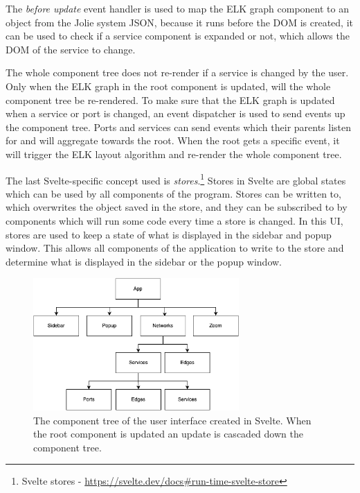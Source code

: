 The \textit{before update} event handler is used to map the ELK graph component to an object from the Jolie system JSON, because it runs before the DOM is created, it can be used to check if a service component is expanded or not, which allows the DOM of the service to change.

The whole component tree does not re-render if a service is changed by the user. Only when the ELK graph in the root component is updated, will the whole component tree be re-rendered. To make sure that the ELK graph is updated when a service or port is changed, an event dispatcher is used to 
send events up the component tree. Ports and services can send events which their parents listen for and will aggregate towards the root. When the root gets a specific event, it will trigger the ELK layout algorithm and re-render the whole component tree.

The last Svelte-specific concept used is \textit{stores}.\footnote{Svelte stores - \url{https://svelte.dev/docs\#run-time-svelte-store}} Stores in Svelte are global states which can be used by all components of the program. Stores can be written to, which overwrites the object saved in the store, and they can be subscribed to by components which will run some code every time a store is changed.
In this UI, stores are used to keep a state of what is displayed in the sidebar and popup window. This allows all components of the application to write to the store and determine what is displayed in the sidebar or the popup window. 

\begin{figure}[t]
    \center
    \includegraphics[width=0.70\textwidth]{figures/component_tree.png}
    \caption{The component tree of the user interface created in Svelte. When the root component is updated an update is cascaded down the component tree.}
    \label{figure:component_tree}
\end{figure}

